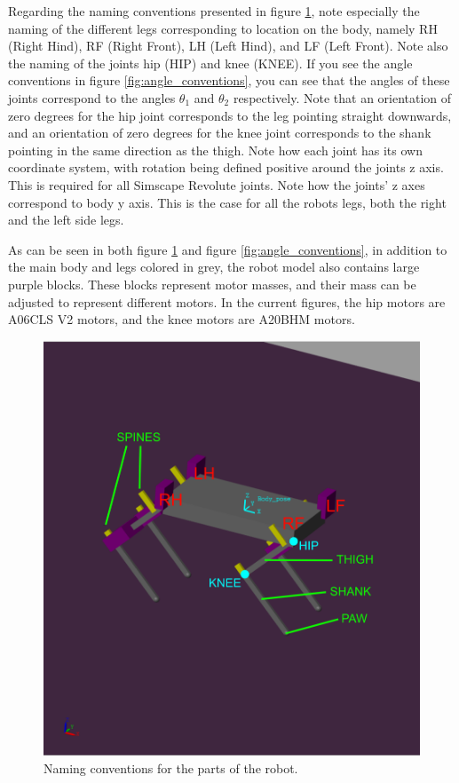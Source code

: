 Regarding the naming conventions presented in figure \ref{fig:name_conventions}, note especially the naming of the different legs corresponding to location on the body, namely RH (Right Hind), RF (Right Front), LH (Left Hind), and LF (Left Front). Note also the naming of the joints hip (HIP) and knee (KNEE). If you see the angle conventions in figure \ref{fig:angle_conventions}, you can see that the angles of these joints correspond to the angles $\theta_1$ and $\theta_2$ respectively. Note that an orientation of zero degrees for the hip joint corresponds to the leg pointing straight downwards, and an orientation of zero degrees for the knee joint corresponds to the shank pointing in the same direction as the thigh. Note how each joint has its own coordinate system, with rotation being defined positive around the joints z axis. This is required for all Simscape Revolute joints. Note how the joints' z axes correspond to body y axis. This is the case for all the robots legs, both the right and the left side legs. 


As can be seen in both figure \ref{fig:name_conventions} and figure \ref{fig:angle_conventions}, in addition to the main body and legs colored in grey, the robot model also contains large purple blocks. These blocks represent motor masses, and their mass can be adjusted to represent different motors. In the current figures, the hip motors are A06CLS V2 motors, and the knee motors are A20BHM motors. 

\begin{figure}
    \centering
    \includegraphics[width=\textwidth]{Images/naming_conventions.png}
    \caption{Naming conventions for the parts of the robot. }
    \label{fig:name_conventions}
\end{figure}

